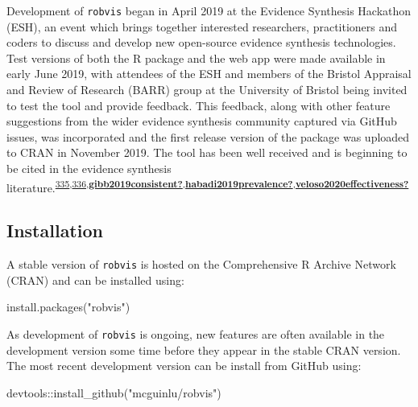 \documentclass[a4paper, twoside]{templates/ociamthesis}
\newenvironment{Shaded}{\begin{snugshade}}{\end{snugshade}}
\newcommand{\FunctionTok}[1]{\textcolor[rgb]{0.00,0.00,0.00}{#1}}
\newcommand{\NormalTok}[1]{#1}
\newcommand{\SpecialCharTok}[1]{\textcolor[rgb]{0.00,0.00,0.00}{#1}}
\newcommand{\StringTok}[1]{\textcolor[rgb]{0.31,0.60,0.02}{#1}}
\renewenvironment{Shaded}
{
  \vspace{4pt}%
  \begin{snugshade}%
}{%
  \end{snugshade}%
  \vspace{4pt}%
}
\begin{document}
Development of \texttt{robvis} began in April 2019 at the Evidence Synthesis Hackathon (ESH), an event which brings together interested researchers, practitioners and coders to discuss and develop new open-source evidence synthesis technologies. Test versions of both the R package and the web app were made available in early June 2019, with attendees of the ESH and members of the Bristol Appraisal and Review of Research (BARR) group at the University of Bristol being invited to test the tool and provide feedback. This feedback, along with other feature suggestions from the wider evidence synthesis community captured via GitHub issues, was incorporated and the first release version of the package was uploaded to CRAN in November 2019. The tool has been well received and is beginning to be cited in the evidence synthesis literature.\textsuperscript{\protect\hyperlink{ref-simillis2020}{335},\protect\hyperlink{ref-tanneru2020}{336},\protect\hyperlink{ref-gibb2019consistent}{\textbf{gibb2019consistent?}},\protect\hyperlink{ref-habadi2019prevalence}{\textbf{habadi2019prevalence?}},\protect\hyperlink{ref-veloso2020effectiveness}{\textbf{veloso2020effectiveness?}}}

\hypertarget{installation-1}{%
\subsection{Installation}\label{installation-1}}

A stable version of \texttt{robvis} is hosted on the Comprehensive R Archive Network (CRAN) and can be installed using:

\begin{Shaded}
\begin{Highlighting}[]
\FunctionTok{install.packages}\NormalTok{(}\StringTok{"robvis"}\NormalTok{)}
\end{Highlighting}
\end{Shaded}

As development of \texttt{robvis} is ongoing, new features are often available in the development version some time before they appear in the stable CRAN version. The most recent development version can be install from GitHub using:

\begin{Shaded}
\begin{Highlighting}[]
\NormalTok{devtools}\SpecialCharTok{::}\FunctionTok{install\_github}\NormalTok{(}\StringTok{"mcguinlu/robvis"}\NormalTok{)}
\end{Highlighting}
\end{Shaded}
\end{document}
